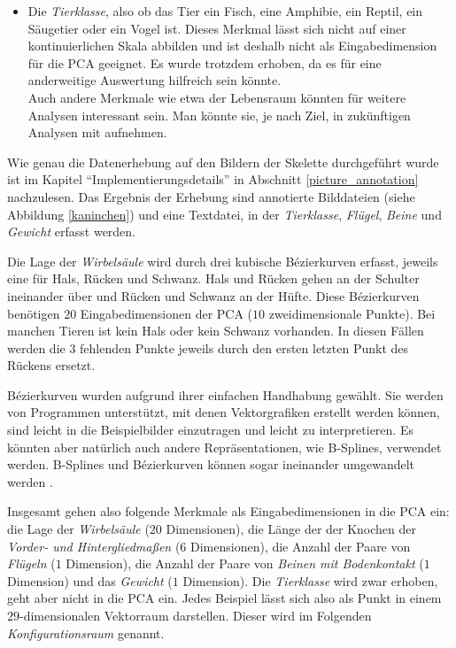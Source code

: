 \begin{itemize}
  \item Die \emph{Tierklasse}, also ob das Tier ein Fisch, eine Amphibie, ein Reptil, ein Säugetier oder ein Vogel ist. Dieses Merkmal lässt sich nicht auf einer kontinuierlichen Skala abbilden und ist deshalb nicht als Eingabedimension für die PCA geeignet. Es wurde trotzdem erhoben, da es für eine anderweitige Auswertung hilfreich sein könnte.\\
  Auch andere Merkmale wie etwa der Lebensraum könnten für weitere Analysen interessant sein. Man könnte sie, je nach Ziel, in zukünftigen Analysen mit aufnehmen.
 \end{itemize}

 Wie genau die Datenerhebung auf den Bildern der Skelette durchgeführt wurde ist im Kapitel "`Implementierungsdetails"' in Abschnitt \ref{picture_annotation} nachzulesen.
 Das Ergebnis der Erhebung sind annotierte Bilddateien (siehe \zb Abbildung \ref{kaninchen}) und eine Textdatei, in der \emph{Tierklasse}, \emph{Flügel}, \emph{Beine} und \emph{Gewicht} erfasst werden.
 
 Die Lage der \emph{Wirbelsäule} wird durch drei kubische Bézierkurven erfasst, jeweils eine für Hals, Rücken und Schwanz. Hals und Rücken gehen an der Schulter ineinander über und Rücken und Schwanz an der Hüfte.
 Diese Bézierkurven benötigen $20$ Eingabedimensionen der PCA ($10$ zweidimensionale Punkte). Bei manchen Tieren ist kein Hals oder kein Schwanz vorhanden. In diesen Fällen werden die $3$ fehlenden Punkte jeweils durch den ersten \bzw letzten Punkt des Rückens ersetzt.
 
 Bézierkurven wurden aufgrund ihrer einfachen Handhabung gewählt. Sie werden von Programmen unterstützt, mit denen Vektorgrafiken erstellt werden können, sind leicht in die Beispielbilder einzutragen und leicht zu interpretieren. Es könnten aber natürlich auch andere Repräsentationen, wie B-Splines, verwendet werden. B-Splines und Bézierkurven können sogar ineinander umgewandelt werden \cite{BezierAndBSplineTechniques}.
 
 Insgesamt gehen also folgende Merkmale als Eingabedimensionen in die PCA ein:
 die Lage der \emph{Wirbelsäule} ($20$ Dimensionen), die Länge der der Knochen der \emph{Vorder- und Hintergliedmaßen} ($6$ Dimensionen), die Anzahl der Paare von \emph{Flügeln} ($1$ Dimension), die Anzahl der Paare von \emph{Beinen mit Bodenkontakt} ($1$ Dimension) und das \emph{Gewicht} ($1$ Dimension). Die \emph{Tierklasse} wird zwar erhoben, geht aber nicht in die PCA ein.
 Jedes Beispiel lässt sich also als Punkt in einem $29$-dimensionalen Vektorraum darstellen. Dieser wird im Folgenden \emph{Konfigurationsraum} genannt.
 
